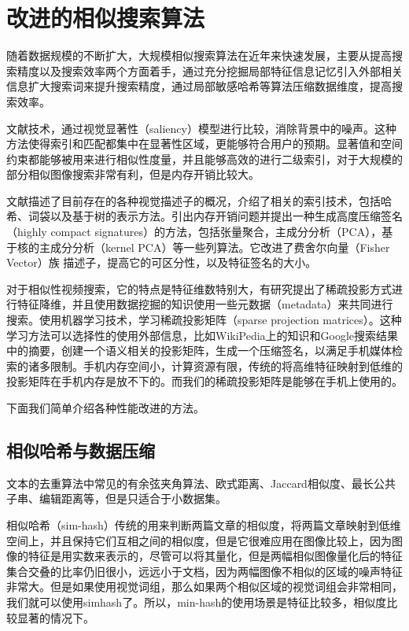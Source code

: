 \section{改进的相似搜索算法}

随着数据规模的不断扩大，大规模相似搜索算法在近年来快速发展，主要从提高搜索精度以及搜索效率两个方面着手，通过充分挖掘局部特征信息记忆引入外部相关信息扩大搜索词来提升搜索精度，通过局部敏感哈希等算法压缩数据维度，提高搜索效率\cite{POLICY:2013te}。

文献\cite{Li:2013ks}技术，通过视觉显著性（saliency）模型进行比较，消除背景中的噪声。这种方法使得索引和匹配都集中在显著性区域，更能够符合用户的预期。显著值和空间约束都能够被用来进行相似性度量，并且能够高效的进行二级索引，对于大规模的部分相似图像搜索非常有利，但是内存开销比较大。

文献\cite{Negrel:2013ur}描述了目前存在的各种视觉描述子的概况，介绍了相关的索引技术，包括哈希、词袋以及基于树的表示方法。引出内存开销问题并提出一种生成高度压缩签名（highly compact signatures）的方法，包括张量聚合，主成分分析（PCA），基于核的主成分分析（kernel PCA）等一些列算法。它改进了费舍尔向量（Fisher Vector）族 描述子，提高它的可区分性，以及特征签名的大小。

对于相似性视频搜索，它的特点是特征维数特别大，有研究提出了稀疏投影方式进行特征降维，并且使用数据挖掘的知识使用一些元数据（metadata）来共同进行搜索\cite{Wu:2013tb}。使用机器学习技术，学习稀疏投影矩阵（sparse projection matrices）。这种学习方法可以选择性的使用外部信息，比如WikiPedia上的知识和Google搜索结果中的摘要，创建一个语义相关的投影矩阵，生成一个压缩签名，以满足手机媒体检索的诸多限制。手机内存空间小，计算资源有限，传统的将高维特征映射到低维的投影矩阵在手机内存是放不下的。而我们的稀疏投影矩阵是能够在手机上使用的。

下面我们简单介绍各种性能改进的方法。

\subsection{相似哈希与数据压缩}
文本的去重算法中常见的有余弦夹角算法、欧式距离、Jaccard相似度、最长公共子串、编辑距离等，但是只适合于小数据集。

相似哈希（sim-hash）传统的用来判断两篇文章的相似度，将两篇文章映射到低维空间上，并且保持它们互相之间的相似度，但是它很难应用在图像比较上，因为图像的特征是用实数来表示的，尽管可以将其量化，但是两幅相似图像量化后的特征集合交叠的比率仍旧很小，远远小于文档，因为两幅图像不相似的区域的噪声特征非常大。但是如果使用视觉词组，那么如果两个相似区域的视觉词组会非常相同，我们就可以使用simhash了。所以，min-hash的使用场景是特征比较多，相似度比较显著的情况下。

